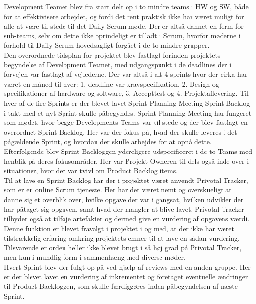 \newline
Development Teamet blev fra start delt op i to mindre teams i HW og SW, både for at effektivisere arbejdet, og fordi det rent praktisk ikke har været muligt for alle at være til stede til det Daily Scrum møde. Der er altså dannet en form for sub-teams, selv om dette ikke oprindeligt er tilladt i Scrum, hvorfor møderne i forhold til Daily Scrum hovedsagligt forgået i de to mindre grupper. \\
Den overordnede tidsplan for projektet blev fastlagt forinden projektets begyndelse af Development Teamet, med udgangspunkt i de deadlines der i forvejen var fastlagt af vejlederne. Der var altså i alt 4 sprints hvor der cirka har været en måned til hver: 1. deadline var kravspecifikation, 2. Design og specifikationer af hardware og software, 3. Accepttest og 4. Projektaflevering.
Til hver af de fire Sprints er der blevet lavet Sprint Planning Meeting Sprint Backlog i takt med et nyt Sprint skulle påbegyndes.
Sprint Planning Meeting har fungeret som mødet, hvor begge Developments Teams var til stede og der blev fastlagt en overordnet Sprint Backlog. Her var der fokus på, hvad der skulle leveres i det pågældende Sprint, og hvordan der skulle arbejdes for at opnå dette.\\ Efterfølgende blev Sprint Backloggen ydereligere udspecificeret i de to Teams med henblik på deres fokusområder. Her var Projekt Owneren til dels også inde over i situationer, hvor der var tvivl om Product Backlog items.\\
Til at lave en Sprint Backlog har der i projektet været anvendt Privotal Tracker, som er en online Scrum tjeneste. Her har det været nemt og overskueligt at danne sig et overblik over, hvilke opgave der var i gangsat, hvilken udvikler der har påtaget sig opgaven, samt hvad der mangler at blive lavet.
Privotal Tracker tilbyder også at tilføje artefakter og dermed give en vurdering af opgavens værdi. Denne funktion er blevet fravalgt i projektet i og med, at der ikke har været tilstrækkelig erfaring omkring projektets emner til at lave en sådan vurdering.
Tilsvarende er orden heller ikke blevet brugt i så høj grad på Privotal Tracker, men kun i mundlig form i sammenhæng med diverse møder. \\
\newline
Hvert Sprint blev der fulgt op på ved hjælp af reviews med en anden gruppe. Her er der blevet lavet en vurdering af inkrementet og foretaget eventuelle ændringer til Product Backloggen, som skulle færdiggøres inden påbegyndelsen af næste Sprint. \\
